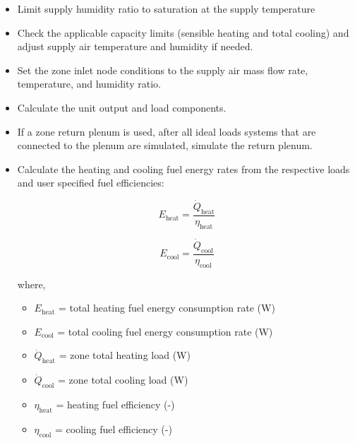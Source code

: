 \begin{itemize}
  \item Limit supply humidity ratio to saturation at the supply temperature
  \item Check the applicable capacity limits (sensible heating and total cooling) and adjust supply air temperature and humidity if needed.
  \item Set the zone inlet node conditions to the supply air mass flow rate, temperature, and humidity ratio.
  \item Calculate the unit output and load components.
  \item If a zone return plenum is used, after all ideal loads systems that are connected to the plenum are simulated, simulate the return plenum.
  \item Calculate the heating and cooling fuel energy rates from the respective loads and user specified fuel efficiencies:

    \begin{equation}
     E_{\text{heat}} = \frac{\dot{Q}_{\text{heat}}}{\eta_{\text{heat}}}
    \end{equation}

    \begin{equation}
     E_{\text{cool}} = \frac{\dot{Q}_{\text{cool}}}{\eta_{\text{cool}}}
    \end{equation}

    where,

    \begin{itemize}
      \item \( E_{\text{heat}} \) = total heating fuel energy consumption rate (W)
      \item \( E_{\text{cool}} \) = total cooling fuel energy consumption rate (W)
      \item \( \dot{Q}_{\text{heat}} \) = zone total heating load (W)
      \item \( \dot{Q}_{\text{cool}} \) = zone total cooling load (W)
      \item \( \eta_{\text{heat}} \) = heating fuel efficiency (-)
      \item \( \eta_{\text{cool}} \) = cooling fuel efficiency (-)
    \end{itemize}

  \end{itemize}
